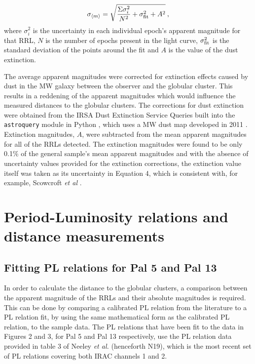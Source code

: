 \documentclass[11pt]{iopart}
\begin{document}
\begin{equation}
    \sigma_{\langle m\rangle} = \sqrt{\frac{\Sigma \sigma_i^2}{N^2} + \sigma_{\rm fit}^2 + A^2}\:,
\end{equation}
where $\sigma_i^2$ is the uncertainty in each individual epoch's apparent magnitude for that RRL, $N$ is the number of epochs present in the light curve, $\sigma_{\rm fit}^2$ is the standard deviation of the points around the fit and $A$ is the value of the dust extinction.

The average apparent magnitudes were corrected for extinction effects caused by dust in the MW galaxy between the observer and the globular cluster. This results in a reddening of the apparent magnitudes which would influence the measured distances to the globular clusters. The corrections for dust extinction were obtained from the IRSA Dust Extinction Service Queries built into the \verb"astroquery" module in Python \cite{Ginsburg2019}, which uses a MW dust map developed in 2011 \cite{schlafly2011measuring}. Extinction magnitudes, $A$, were subtracted from the mean apparent magnitudes for all of the RRLs detected. The extinction magnitudes were found to be only 0.1\% of the general sample's mean apparent magnitudes and with the absence of uncertainty values provided for the extinction corrections, the extinction value itself was taken as its uncertainty in Equation 4, which is consistent with, for example, Scowcroft \textit{et al} \cite{scowcroft2011}.

\section{Period-Luminosity relations and distance measurements}
\label{pl and distances}
\subsection{Fitting PL relations for Pal 5 and Pal 13}
In order to calculate the distance to the globular clusters, a comparison between the apparent magnitude of the RRLs and their absolute magnitudes is required. This can be done by comparing a calibrated PL relation from the literature to a PL relation fit, by using the same mathematical form as the calibrated PL relation, to the sample data. The PL relations that have been fit to the data in Figures 2 and 3, for Pal 5 and Pal 13 respectively, use the PL relation data provided in table 3 of Neeley \textit{et al.} \cite{neeley2019} (henceforth N19), which is the most recent set of PL relations covering both IRAC channels 1 and 2.
\end{document}
